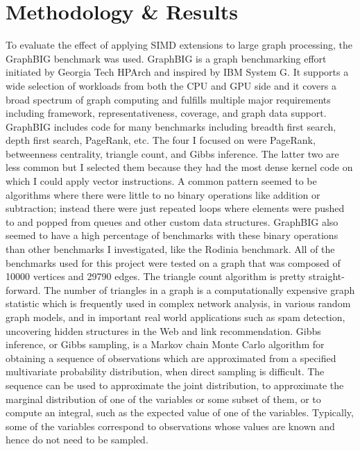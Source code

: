 \documentclass[conference]{IEEEtran}
\begin{document}
\section{Methodology \& Results}

To evaluate the effect of applying SIMD extensions to large graph processing, the GraphBIG benchmark was used.  GraphBIG is a graph benchmarking effort initiated by Georgia Tech HPArch and inspired by IBM System G.  It supports a wide selection of workloads from both the CPU and GPU side and it covers a broad spectrum of graph computing and fulfills multiple major requirements including framework, representativeness, coverage, and graph data support.  GraphBIG includes code for many benchmarks including breadth first search, depth first search, PageRank, etc.  The four I focused on were PageRank, betweenness centrality, triangle count, and Gibbs inference.  The latter two are less common but I selected them because they had the most dense kernel code on which I could apply vector instructions.  A common pattern seemed to be algorithms where there were little to no binary operations like addition or subtraction; instead there were just repeated loops where elements were pushed to and popped from queues and other custom data structures.  GraphBIG also seemed to have a high percentage of benchmarks with these binary operations than other benchmarks I investigated, like the Rodinia benchmark.  All of the benchmarks used for this project were tested on a graph that was composed of 10000 vertices and 29790 edges.  The triangle count algorithm is pretty straight-forward.  The number of triangles in a graph is a computationally expensive graph statistic which is frequently used in complex network analysis, in various random graph models, and in important real world applications such as spam detection, uncovering hidden structures in the Web and link recommendation.  Gibbs inference, or Gibbs sampling, is a Markov chain Monte Carlo algorithm for obtaining a sequence of observations which are approximated from a specified multivariate probability distribution, when direct sampling is difficult.  The sequence can be used to approximate the joint distribution, to approximate the marginal distribution of one of the variables or some subset of them, or to compute an integral, such as the expected value of one of the variables.  Typically, some of the variables correspond to observations whose values are known and hence do not need to be sampled.  
\end{document}

